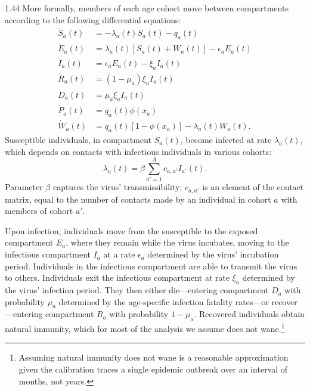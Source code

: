 \documentclass[12pt]{article}
\newcommand{\efficacy}{\phi}
\begin{document}
\begin{spacing}{1.44}
More formally, members of each age cohort move between compartments
according to the following differential equations:
\begin{align}
\dot{S}_a(t) &= - \lambda_a(t) S_a(t) - q_a(t) \label{S} \\
\dot{E}_a(t) &= \lambda_a(t) [ S_a(t) + W_a(t) ] - \epsilon_a E_a(t) \label{E} \\
\dot{I}_a(t) &= \epsilon_a E_a(t) - \xi_a I_a(t) \label{I} \\
\dot{R}_a(t) &= (1 - \mu_a) \xi_a I_a(t) \label{R} \\
\dot{D}_a(t) &= \mu_a \xi_a I_a(t) \label{D} \\
\dot{P}_a(t) &= q_a(t) \efficacy(x_a) \label{P} \\
\dot{W}_a(t) &= q_a(t) [ 1 - \efficacy(x_a)] - \lambda_a(t) W_a(t). \label{W} 
\end{align}
Susceptible individuals, in compartment $S_a(t)$, become infected at
rate $\lambda_a(t)$, which depends on contacts with infectious
individuals in various cohorts:
\begin{equation}
\label{contact}
\lambda_a(t) = \beta \sum_{a' = 1}^A c_{a, a'} I_{a'}(t).
\end{equation}
Parameter $\beta$ captures the virus' transmissibility; $c_{a, a'}$ is
an element of the contact matrix, equal to the number of contacts made
by an individual in cohort $a$ with members of cohort $a'$.

Upon infection, individuals move from the susceptible to the exposed
compartment $E_a$, where they remain while the virus incubates, moving
to the infectious compartment $I_a$ at a rate $\epsilon_a$ determined
by the virus' incubation period. Individuals in the infectious
compartment are able to transmit the virus to others. Individuals exit
the infectious compartment at rate $\xi_a$ determined by the virus'
infection period. They then either die---entering compartment $D_a$
with probability $\mu_a$ determined by the age-specific infection
fatality rates---or recover---entering compartment $R_a$ with
probability $1 - \mu_a$. Recovered individuals obtain natural
immunity, which for most of the analysis we assume does not
wane.\footnote{Assuming natural immunity does not wane is a reasonable
approximation given the calibration traces a single epidemic outbreak
over an interval of months, not years.}


\end{spacing}
\end{document}
